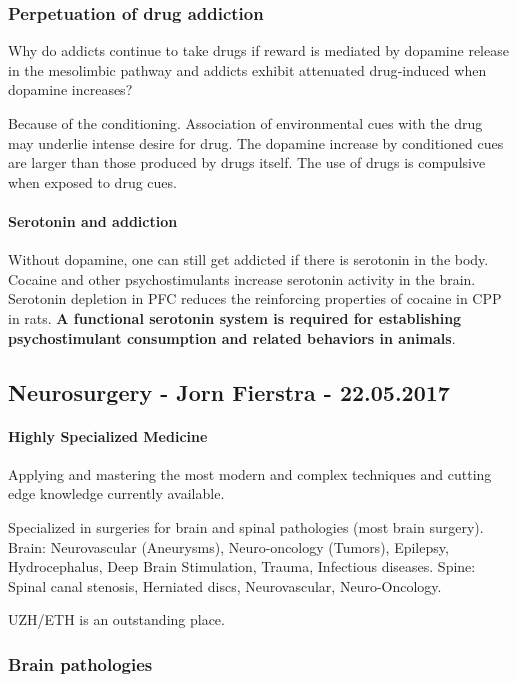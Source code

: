 \documentclass[12pt,article,oneside,a4paper]{memoir}
\begin{document}
\subsubsection{Perpetuation of drug addiction}
Why do addicts continue to take drugs if reward is mediated by dopamine release
in the mesolimbic pathway and addicts exhibit attenuated drug‐induced when
dopamine increases?

Because of the conditioning. Association of environmental cues with the drug may
underlie intense desire for drug. The dopamine increase by conditioned cues are
larger than those produced by drugs itself. The use of drugs is compulsive when
exposed to drug cues.

\paragraph{Serotonin and addiction}
Without dopamine, one can still get addicted if there is serotonin in the body.
Cocaine and other psychostimulants increase serotonin activity in the brain.
Serotonin depletion in PFC reduces the reinforcing properties of cocaine in CPP
in rats. \textbf{A functional serotonin system is required for establishing
psychostimulant consumption and related behaviors in animals}.

\newpage
\subsection{Neurosurgery - Jorn Fierstra - 22.05.2017}
\paragraph{Highly Specialized Medicine}
Applying and mastering the most modern and complex techniques and cutting edge
knowledge currently available.

Specialized in surgeries for brain and spinal pathologies (most brain surgery).
Brain: Neurovascular (Aneurysms), Neuro-oncology (Tumors), Epilepsy,
Hydrocephalus, Deep Brain Stimulation, Trauma, Infectious diseases.
Spine: Spinal canal stenosis, Herniated discs, Neurovascular, Neuro-Oncology.

UZH/ETH is an outstanding place.

\subsubsection{Brain pathologies}
\end{document}

